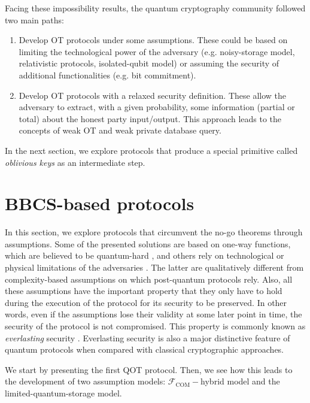 Facing these impossibility results, the quantum cryptography community followed two main paths:

\begin{enumerate}
    \item Develop OT protocols under some assumptions. These could be based on limiting the technological power of the adversary (e.g. noisy-storage model, relativistic protocols, isolated-qubit model) or assuming the security of additional functionalities (e.g. bit commitment).
    \item Develop OT protocols with a relaxed security definition. These allow the adversary to extract, with a given probability, some information (partial or total) about the honest party input/output. This approach leads to the concepts of weak OT  and weak private database query.
\end{enumerate}

In the next section, we explore protocols that produce a special primitive called \textit{oblivious keys} as an intermediate step.


\section{BBCS-based protocols}

In this section, we explore protocols that circumvent the no-go theorems \cite{LC97, M97} through assumptions. Some of the presented solutions are based on one-way functions, which are believed to be quantum-hard \cite{BCKM21, GLSV21,A02}, and others rely on technological or physical limitations of the adversaries \cite{DFSS05, WST08, KWW12, L14, Pit16, Ken11}. The latter are qualitatively different from complexity-based assumptions on which post-quantum protocols rely. Also, all these assumptions have the important property that they only have to hold during the execution of the protocol for its security to be preserved. In other words, even if the assumptions lose their validity at some later point in time, the security of the protocol is not compromised. This property is commonly known as \textit{everlasting} security \cite{U18}. Everlasting security is also a major distinctive feature of quantum protocols when compared with classical cryptographic approaches.

We start by presenting the first QOT protocol. Then, we see how this leads to the development of two assumption models: $\mathcal{F}_{\text{COM}}-$hybrid model and the limited-quantum-storage model. 

